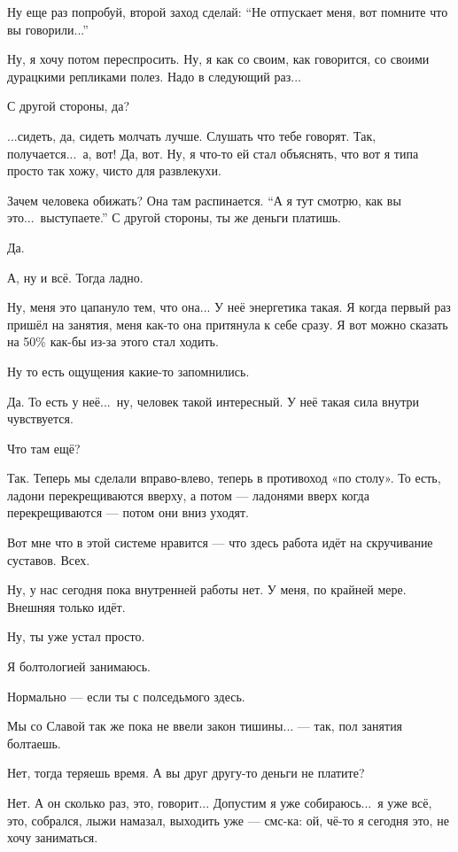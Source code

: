 \M
Ну еще раз попробуй, второй заход сделай:
``Не отпускает меня, вот помните что вы говорили...''

\I
Ну, я хочу потом переспросить. Ну, я как со своим,
как говорится, со своими дурацкими
репликами полез.
Надо в следующий раз...

\M
С другой стороны, да?

\I
...сидеть, да, сидеть молчать лучше. Слушать что тебе говорят. Так,
получается...\ а, вот! Да, вот.
Ну, я что-то ей стал объяснять, что вот я типа просто так хожу, чисто для развлекухи.

\M
Зачем человека обижать? Она там распинается.
``А я тут смотрю, как вы это...\ выступаете.''
С другой стороны, ты же деньги платишь.

\I
Да.

\M
А, ну и всё. Тогда ладно.

\I
Ну, меня это цапануло тем, что она... У неё
энергетика такая. Я когда первый раз пришёл на занятия, меня как-то она притянула к себе сразу.
Я вот можно сказать на 50\% как-бы из-за этого стал ходить.

\M
Ну то есть ощущения какие-то запомнились.

\I
Да. То есть у неё...\ ну, человек такой интересный. У неё такая сила внутри чувствуется.

\M
Что там ещё?

\I
Так. Теперь мы сделали вправо-влево, теперь в противоход «по столу».
То есть, ладони перекрещиваются вверху,
а потом --- ладонями вверх когда перекрещиваются --- потом они вниз уходят.

\M
Вот мне что в этой системе нравится --- что здесь работа идёт на скручивание суставов.
Всех.

\I
Ну, у нас сегодня пока внутренней работы нет. У меня, по крайней мере. Внешняя только идёт.

\M
Ну, ты уже устал просто.

\I
Я болтологией занимаюсь.

\M
Нормально --- если ты с полседьмого здесь.

\I
Мы со Славой так же пока не ввели закон
тишины... --- так, пол занятия болтаешь.

\M
Нет, тогда теряешь время.
А вы друг другу-то деньги не платите?

\I
Нет. А он сколько раз, это, говорит... Допустим я уже
собираюсь...\ я уже всё, это, собрался, лыжи намазал, выходить уже --- смс-ка:
ой, чё-то я сегодня это, не хочу заниматься.

